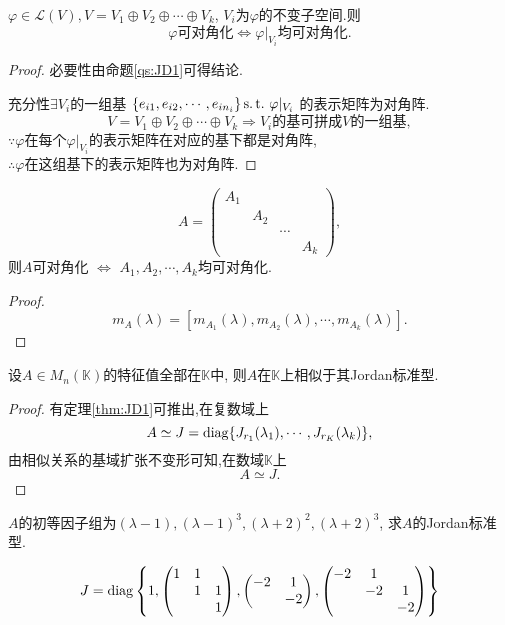  \begin{question}\label{qs:JD2}
   $\varphi\in \mathcal{L}(V), V=V_1\oplus V_2\oplus\cdots\oplus V_k$,
   $V_i$为$\varphi$的不变子空间.则
   \[\varphi\text{可对角化} \Longleftrightarrow
     \varphi|_{V_i}\text{均可对角化}.\]
\end{question}
\begin{proof}
  {\heiti 必要性}由命题\ref{qs:JD1}可得结论.

  {\heiti 充分性}$\exists V_i$的一组基
  $\{e_{i1},e_{i2},\cdots,e_{in_i}\} \operatorname{s.t.{}} \varphi|_{V_i}$
  的表示矩阵为对角阵.
  \[V=V_1\oplus V_2\oplus\cdots\oplus V_k \Longrightarrow V_i\text{的基可拼成}V\text{的一组基},\]
  $\because \varphi$在每个$\varphi|_{V_i}$的表示矩阵在对应的基下都是对角阵,\\
  $\therefore \varphi$在这组基下的表示矩阵也为对角阵.
\end{proof}
\begin{deduction}\label{dd:JD3}
  \[A=
    \begin{pmatrix}
      A_1 &&&\\
          & A_2 &&\\
          &&\cdots&\\
      &&&A_k
    \end{pmatrix},\]
  则$A$可对角化 $\Longleftrightarrow$
  $A_1,A_2,\cdots,A_k$均可对角化.
\end{deduction}
\begin{proof}
  \[m_A(\lambda)=[m_{A_1}(\lambda),m_{A_2}(\lambda),\cdots,m_{A_k}(\lambda)].\]
\end{proof}

\begin{deduction}\label{dd:JD4}
  设$A\in M_n(\mathbb{K})$的特征值全部在$\mathbb{K}$中,
  则$A$在$\mathbb{K}$上相似于其Jordan标准型.
\end{deduction}
\begin{proof}
  有定理\ref{thm:JD1}可推出,在复数域上
  \[A \simeq J=\operatorname{diag}\{J_{r_1}(\lambda_1),\cdots,J_{r_K}(\lambda_k)\},\]
  由相似关系的基域扩张不变形可知,在数域$\mathbb{K}$上
  \[A \simeq J.\]
\end{proof}

\begin{example}\label{exl:JD2}
  $A$的初等因子组为$(\lambda-1),(\lambda-1)^3,(\lambda+2)^2,(\lambda+2)^3$,
  求$A$的Jordan标准型.
\end{example}
\begin{solution}
  \[J=\operatorname{diag}\left\{1,
    \begin{pmatrix}
      1&1&\\
       &1&1\\
      &&1
    \end{pmatrix},
    \begin{pmatrix}
      -2 & 1\\
      &-2
    \end{pmatrix},
    \begin{pmatrix}
      -2&1&\\
        &-2&1\\
      &&-2
    \end{pmatrix}\right\}\]
\end{solution}

